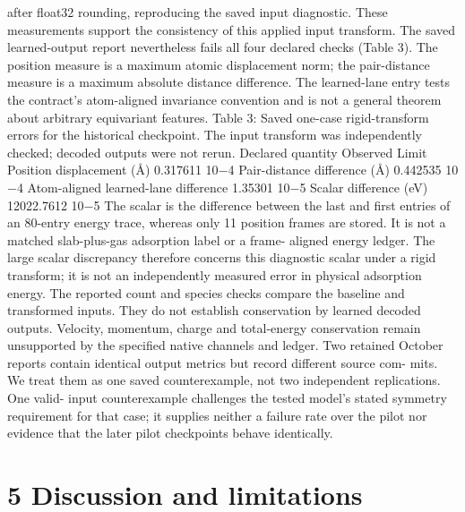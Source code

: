 \documentclass[11pt]{article}
\begin{document}
after float32 rounding, reproducing the saved input diagnostic. These measurements support the
consistency of this applied input transform.
The saved learned-output report nevertheless fails all four declared checks (Table 3). The position
measure is a maximum atomic displacement norm; the pair-distance measure is a maximum absolute
distance difference. The learned-lane entry tests the contract’s atom-aligned invariance convention
and is not a general theorem about arbitrary equivariant features.
Table 3: Saved one-case rigid-transform errors for the historical checkpoint. The input transform
was independently checked; decoded outputs were not rerun.
Declared quantity Observed Limit
Position displacement (Å) 0.317611 10\ensuremath{-}4
Pair-distance difference (Å) 0.442535 10\ensuremath{-}4
Atom-aligned learned-lane difference 1.35301 10\ensuremath{-}5
Scalar difference (eV) 12022.7612 10\ensuremath{-}5
The scalar is the difference between the last and first entries of an 80-entry energy trace, whereas
only 11 position frames are stored. It is not a matched slab-plus-gas adsorption label or a frame-
aligned energy ledger. The large scalar discrepancy therefore concerns this diagnostic scalar under
a rigid transform; it is not an independently measured error in physical adsorption energy. The
reported count and species checks compare the baseline and transformed inputs. They do not
establish conservation by learned decoded outputs. Velocity, momentum, charge and total-energy
conservation remain unsupported by the specified native channels and ledger.
Two retained October reports contain identical output metrics but record different source com-
mits. We treat them as one saved counterexample, not two independent replications. One valid-
input counterexample challenges the tested model’s stated symmetry requirement for that case; it
supplies neither a failure rate over the pilot nor evidence that the later pilot checkpoints behave
identically.

\section*{5 Discussion and limitations}
\end{document}
